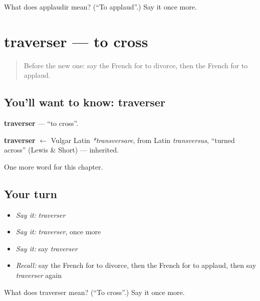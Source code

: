 \begin{tcolorbox}[breakable,colback=teal!4,colframe=teal!35!black,title={Before you move on}]
What does applaudir mean? (\textquotedblleft{}To applaud\textquotedblright{}.) Say it once more.
\end{tcolorbox}
\section[traverser]{traverser — to cross}

\label{lesson:FR-C208-traverser}



\begin{quote}
Before the new one: say the French for to divorce, then the French for to applaud.
\end{quote}

\subsection*{You'll want to know: traverser}
\textbf{traverser} — \textquotedblleft{}to cross\textquotedblright{}.

\begin{cousinweb}
\textbf{traverser} $\leftarrow$ Vulgar Latin \emph{*transversare}, from Latin \emph{transversus}, \textquotedblleft{}turned across\textquotedblright{} (Lewis \& Short) — inherited.
\end{cousinweb}

\begin{grammarlens}[title={What you've built}]
One more word for this chapter.
\end{grammarlens}

\subsection*{Your turn}
\begin{itemize}
\raggedright
  \item \emph{Say it:} \emph{traverser}
  \item \emph{Say it:} \emph{traverser}, once more
  \item \emph{Say it:} say \emph{traverser}
  \item \emph{Recall:} say the French for to divorce, then the French for to applaud, then say \emph{traverser} again
\end{itemize}

\begin{tcolorbox}[breakable,colback=teal!4,colframe=teal!35!black,title={Before you move on}]
What does traverser mean? (\textquotedblleft{}To cross\textquotedblright{}.) Say it once more.
\end{tcolorbox}

